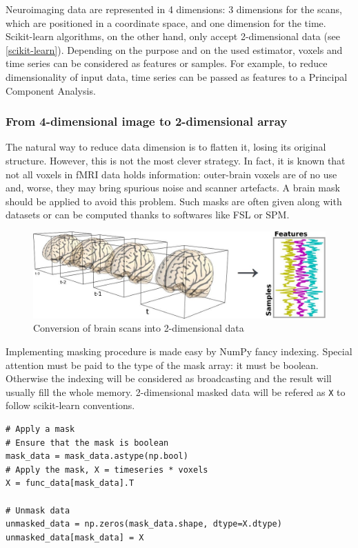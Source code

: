 \documentclass{frontiersSCNS} %
\begin{document}
Neuroimaging data are represented in 4 dimensions: 3 dimensions for the scans,
which are positioned in a coordinate space, and one dimension for the time.
Scikit-learn algorithms, on the other hand, only accept 2-dimensional data (see
\ref{scikit-learn}).
Depending on the purpose and on the used estimator, voxels and time series can be
considered as features
or samples. For example, to reduce dimensionality of input data,
time series can be passed as features to a Principal Component Analysis.

\subsubsection{From 4-dimensional image to 2-dimensional array}

The natural way to reduce data dimension is to flatten it, losing its original
structure. However, this is not the most clever strategy. In fact, it is known
that not all voxels in fMRI data holds information: outer-brain voxels are of no
use and, worse, they may bring spurious noise and scanner artefacts.
A brain mask should be applied to avoid this problem. Such masks
are often given along with datasets or can be computed thanks to softwares like
FSL or SPM.\\

\begin{figure}[hbtp]
    \begin{center}
        \includegraphics[width=.5\linewidth]{img/niimgs.jpg}
    \end{center}
    \caption{Conversion of brain scans into 2-dimensional data}
    \label{fig:niimg}
\end{figure}

Implementing masking procedure is made easy by NumPy fancy
indexing. Special attention must be paid to the type of the mask array: it must
be boolean. Otherwise the indexing will be considered as broadcasting and the
result will usually fill the whole memory.
2-dimensional masked data will be refered as \texttt{X} to follow scikit-learn
conventions.

\begin{lstlisting}
# Apply a mask
# Ensure that the mask is boolean
mask_data = mask_data.astype(np.bool)
# Apply the mask, X = timeseries * voxels
X = func_data[mask_data].T

# Unmask data
unmasked_data = np.zeros(mask_data.shape, dtype=X.dtype)
unmasked_data[mask_data] = X
\end{lstlisting}
\end{document}
